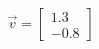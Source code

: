 \documentclass[preview]{standalone}
\begin{document}
\begin{align*}
\vec{v}=\begin{bmatrix}1.3\\-0.8\end{bmatrix}
\end{align*}
\end{document}
